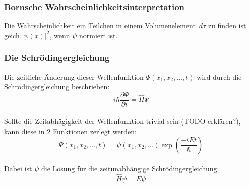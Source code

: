 \subsubsection{Bornsche Wahrscheinlichkeitsinterpretation}
Die Wahrscheinlichkeit ein Teilchen in einem Volumenelement $\,d\tau$ zu finden ist geich
$\vert \psi(x) \vert^2$, wenn $\psi$ normiert ist.\cite[S. 24]{atkins_friedman_2011}

\subsubsection{Die Schrödingergleichung}
Die zeitliche Änderung dieser Wellenfunktion $\Psi(x_1, x_2, \dots, t)$ 
wird durch die Schrödingergleichung beschrieben:
\begin{equation}
  i\hbar\frac{\partial\Psi}{\partial t} = \hat{H}\Psi
\end{equation}\\
Sollte die Zeitabhägigkeit der Wellenfunktion trivial sein (TODO erklären?),
kann diese in 2 Funktionen zerlegt werden:
\begin{equation*}
  \Psi(x_1, x_2, \dots, t) = \psi(x_1, x_2, \dots) \exp(\frac{-iEt}{\hbar})
\end{equation*}\\
Dabei ist $\psi$ die Lösung für die zeitunabhängige Schrödingergleichung:
\begin{equation}
  \hat{H}\psi = E\psi
\end{equation}
\cite[S. 24-25]{atkins_friedman_2011}